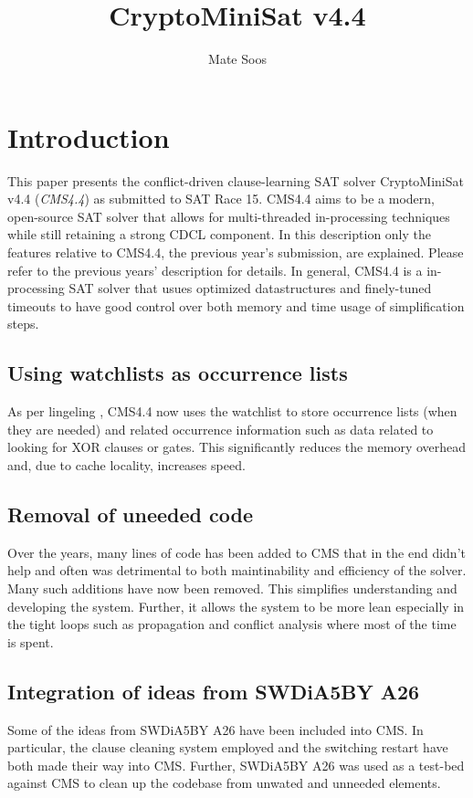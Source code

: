 \documentclass[final]{ieee}
\begin{document}
\title{CryptoMiniSat v4.4}
\author{Mate Soos}

\maketitle
\thispagestyle{empty}
\pagestyle{empty}

\section{Introduction}
This paper presents the conflict-driven clause-learning SAT solver CryptoMiniSat v4.4 (\emph{CMS4.4}) as submitted to SAT Race 15. CMS4.4 aims to be a modern, open-source SAT solver that allows for multi-threaded in-processing techniques while still retaining a strong CDCL component. In this description only the features relative to CMS4.4, the previous year's submission, are explained. Please refer to the previous years' description for details. In general, CMS4.4 is a in-processing SAT solver that usues optimized datastructures and finely-tuned timeouts to have good control over both memory and time usage of simplification steps.

\subsection{Using watchlists as occurrence lists}
As per lingeling \cite{lingeling}, CMS4.4 now uses the watchlist to store occurrence lists (when they are needed) and related occurrence information such as data related to looking for XOR clauses or gates. This significantly reduces the memory overhead and, due to cache locality, increases speed.

\subsection{Removal of uneeded code}
Over the years, many lines of code has been added to CMS that in the end didn't help and often was detrimental to both maintinability and efficiency of the solver. Many such additions have now been removed. This simplifies understanding and developing the system. Further, it allows the system to be more lean especially in the tight loops such as propagation and conflict analysis where most of the time is spent.

\subsection{Integration of ideas from SWDiA5BY A26}
Some of the ideas from SWDiA5BY A26\cite{swdia} have been included into CMS. In particular, the clause cleaning system employed and the switching restart have both made their way into CMS. Further, SWDiA5BY A26 was used as a test-bed against CMS to clean up the codebase from unwated and unneeded elements.
\end{document}
